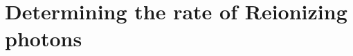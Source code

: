 
\section{Determining the rate of Reionizing photons} %
\label{sec:determining_the_rate_of_re_ionizing_photons}

